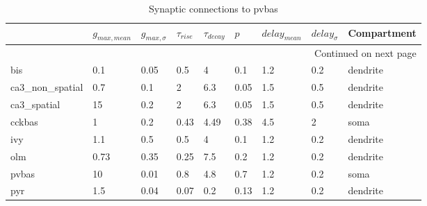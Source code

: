 \begin{longtable}{lllllllll}
\caption{Synaptic connections to pvbas}\label{pvbas_synapses}\\
\toprule
{} &  $g_{max, mean}$ & $g_{max, \sigma}$ & $\tau_{rise}$ & $\tau_{decay}$ &  $p$ & $delay_{mean}$ & $delay_{\sigma}$ & Compartment \\
\midrule
\endhead
\midrule
\multicolumn{9}{r}{{Continued on next page}} \\
\midrule
\endfoot

\bottomrule
\endlastfoot
bis             &   0.1 &     0.05 &      0.5 &         4 &   0.1 &   1.2 &       0.2 &      dendrite\ \\
ca3\_non\_spatial &   0.7 &      0.1 &        2 &       6.3 &  0.05 &   1.5 &       0.5 &      dendrite\ \\
ca3\_spatial     &    15 &      0.2 &        2 &       6.3 &  0.05 &   1.5 &       0.5 &      dendrite\ \\
cckbas          &     1 &      0.2 &     0.43 &      4.49 &  0.38 &   4.5 &         2 &               soma \\
ivy             &   1.1 &      0.5 &      0.5 &         4 &   0.1 &   1.2 &       0.2 &      dendrite\ \\
olm             &  0.73 &     0.35 &     0.25 &       7.5 &   0.2 &   1.2 &       0.2 &      dendrite\ \\
pvbas           &    10 &     0.01 &      0.8 &       4.8 &   0.7 &   1.2 &       0.2 &               soma \\
pyr             &   1.5 &     0.04 &     0.07 &       0.2 &  0.13 &   1.2 &       0.2 &      dendrite\ \\
\end{longtable}
